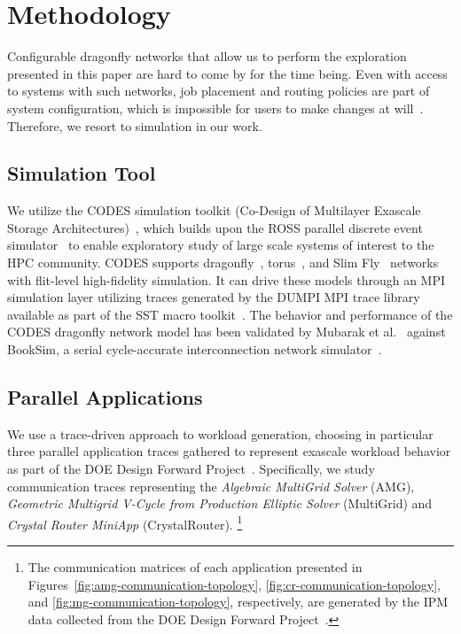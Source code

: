 

\section{Methodology}
\label{sec: methodology}

Configurable dragonfly networks that allow us to perform the exploration presented in this paper are hard to come by for the time being. Even with access to systems with such networks, job placement and routing policies are part of system configuration, which is impossible for users to make changes at will~\cite{jain-sc14, bhatele-sc11, zhou-ipdps-2015, jokanovic-ipdps-2015}. Therefore, we resort to simulation in our work.


\subsection{Simulation Tool}
\label{sec:simulation-tool}

We utilize the CODES simulation toolkit (Co-Design of Multilayer Exascale Storage Architectures)~\cite{misbah-tpds}, which builds upon the ROSS parallel discrete event simulator~\cite{carothers_ross:_2002,barnes_warp_2013} to enable exploratory study of large scale systems of interest to the HPC community. CODES supports dragonfly~\cite{codes-dragonfly, misbah-tpds}, torus~\cite{misbah-pads-2014, ning-pads-2011}, and Slim Fly~\cite{wolfe-pads-2016} networks with flit-level high-fidelity simulation. It can drive these models through an MPI simulation layer utilizing traces generated by the DUMPI MPI trace library available as part of the SST macro toolkit~\cite{sst}. 
The behavior and performance of the CODES dragonfly network model has been validated by Mubarak et al.\ \cite{codes-dragonfly} against BookSim, a serial cycle-accurate interconnection network simulator~\cite{booksim-simulator}.

\subsection{Parallel Applications}
\label{sec: application traces}

We use a trace-driven approach to workload generation, choosing in particular three parallel application traces gathered to represent exascale workload behavior as part of the DOE Design Forward Project~\cite{designforward-webpage,designforward-traces}. Specifically, we study communication traces representing the \emph{Algebraic MultiGrid Solver} (AMG), \emph{Geometric Multigrid V-Cycle from Production Elliptic Solver} (MultiGrid) and \emph{Crystal Router MiniApp} (CrystalRouter). \footnote{The communication matrices of each application presented in Figures~\ref{fig:amg-communication-topology}, \ref{fig:cr-communication-topology}, and \ref{fig:mg-communication-topology}, respectively, are generated by the IPM data collected from the DOE Design Forward Project~\cite{designforward-traces}. }

